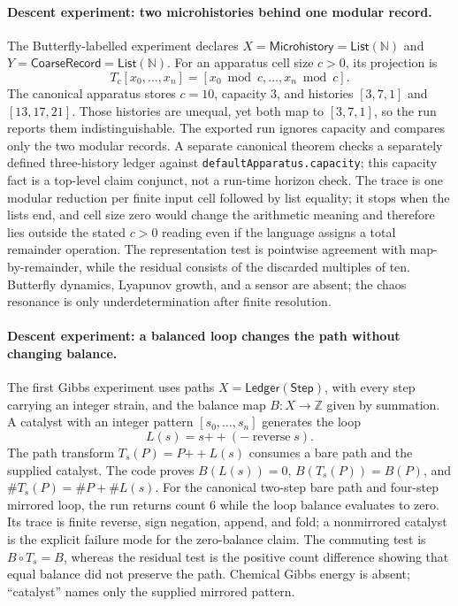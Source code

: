 \paragraph{Descent experiment: two microhistories behind one modular record.}
The Butterfly-labelled experiment declares \(X=\mathsf{Microhistory}=\mathsf{List}(\mathbb N)\) and \(Y=\mathsf{CoarseRecord}=\mathsf{List}(\mathbb N)\).
For an apparatus cell size \(c>0\), its projection is
\[
 T_c[x_0,\ldots,x_n]=[x_0\bmod c,\ldots,x_n\bmod c].
\]
The canonical apparatus stores \(c=10\), capacity \(3\), and histories \([3,7,1]\) and \([13,17,21]\).
Those histories are unequal, yet both map to \([3,7,1]\), so the run reports them indistinguishable.
The exported run ignores capacity and compares only the two modular records.
A separate canonical theorem checks a separately defined three-history ledger against \texttt{defaultApparatus.capacity}; this capacity fact is a top-level claim conjunct, not a run-time horizon check.
The trace is one modular reduction per finite input cell followed by list equality; it stops when the lists end, and cell size zero would change the arithmetic meaning and therefore lies outside the stated \(c>0\) reading even if the language assigns a total remainder operation.
The representation test is pointwise agreement with map-by-remainder, while the residual consists of the discarded multiples of ten.
Butterfly dynamics, Lyapunov growth, and a sensor are absent; the chaos resonance is only underdetermination after
finite resolution.

\paragraph{Descent experiment: a balanced loop changes the path without changing balance.}
The first Gibbs experiment uses paths \(X=\mathsf{Ledger}(\mathsf{Step})\), with every step carrying an integer strain, and the balance map \(B:X\to\mathbb Z\) given by summation.
A catalyst with an integer pattern \([s_0,\ldots,s_n]\) generates the loop
\[
 L(s)=s\mathbin{++}(-\operatorname{reverse}s).
\]
The path transform \(T_s(P)=P\mathbin{++}L(s)\) consumes a bare path and the supplied catalyst.
The code proves \(B(L(s))=0\), \(B(T_s(P))=B(P)\), and \(\#T_s(P)=\#P+\#L(s)\).
For the canonical two-step bare path and four-step mirrored loop, the run returns count \(6\) while the loop balance evaluates to zero.
Its trace is finite reverse, sign negation, append, and fold; a nonmirrored catalyst is the explicit failure mode for
the zero-balance claim.
The commuting test is \(B\circ T_s=B\), whereas the residual test is the positive count difference showing that equal balance did not preserve the path.
Chemical Gibbs energy is absent; ``catalyst'' names only the supplied mirrored pattern.

